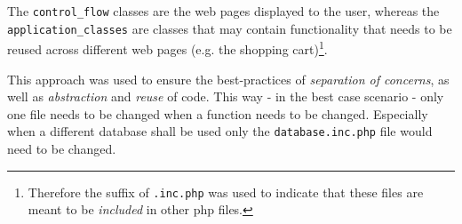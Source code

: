 The \texttt{control\_flow} classes are the web pages displayed to the user, whereas the \texttt{application\_classes} are classes that may contain functionality that needs to be reused across different web pages (e.g. the shopping cart)\footnote{Therefore the suffix of \texttt{.inc.php} was used to indicate that these files are meant to be \textit{included} in other php files.}.

This approach was used to ensure the best-practices of \textit{separation of concerns}, as well as \textit{abstraction} and \textit{reuse} of code.
This way - in the best case scenario - only one file needs to be changed when a function needs to be changed. Especially when a different database shall be used only the \texttt{database.inc.php} file would need to be changed.